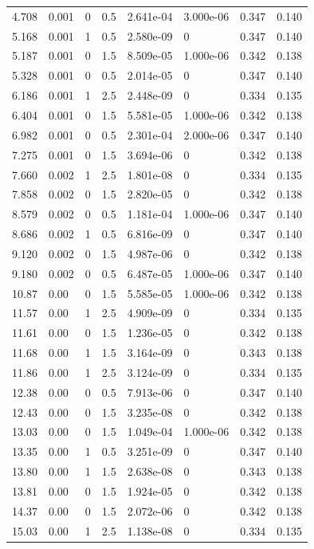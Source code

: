 \documentclass[preview]{standalone}
\begin{document}
{{\begin{tabular}{L{1.2cm}C{1.2cm} C{0.3cm}C{0.5cm} C{1.4cm}C{1.4cm} C{1.4cm}C{1.4cm}}
  4.708  &  0.001  & 0     & 0.5 &  2.641e-04  & 3.000e-06  & 0.347 &  0.140   \\ 
  5.168  &  0.001  & 1     & 0.5 &  2.580e-09  & 0  & 0.347 &  0.140   \\ 
  5.187  &  0.001  & 0     & 1.5 &  8.509e-05  & 1.000e-06  & 0.342 &  0.138   \\ 
  5.328  &  0.001  & 0     & 0.5 &  2.014e-05  & 0  & 0.347 &  0.140   \\ 
  6.186  &  0.001  & 1     & 2.5 &  2.448e-09  & 0  & 0.334 &  0.135   \\ 
  6.404  &  0.001  & 0     & 1.5 &  5.581e-05  & 1.000e-06  & 0.342 &  0.138   \\ 
  6.982  &  0.001  & 0     & 0.5 &  2.301e-04  & 2.000e-06  & 0.347 &  0.140   \\ 
  7.275  &  0.001  & 0     & 1.5 &  3.694e-06  & 0  & 0.342 &  0.138   \\ 
  7.660  &  0.002  & 1     & 2.5 &  1.801e-08  & 0  & 0.334 &  0.135   \\ 
  7.858  &  0.002  & 0     & 1.5 &  2.820e-05  & 0  & 0.342 &  0.138   \\ 
  8.579  &  0.002  & 0     & 0.5 &  1.181e-04  & 1.000e-06  & 0.347 &  0.140   \\ 
  8.686  &  0.002  & 1     & 0.5 &  6.816e-09  & 0  & 0.347 &  0.140   \\ 
  9.120  &  0.002  & 0     & 1.5 &  4.987e-06  & 0  & 0.342 &  0.138   \\ 
  9.180  &  0.002  & 0     & 0.5 &  6.487e-05  & 1.000e-06  & 0.347 &  0.140   \\ 
  10.87  &  0.00  & 0     & 1.5 &  5.585e-05  & 1.000e-06  & 0.342 &  0.138   \\ 
  11.57  &  0.00  & 1     & 2.5 &  4.909e-09  & 0  & 0.334 &  0.135   \\ 
  11.61  &  0.00  & 0     & 1.5 &  1.236e-05  & 0  & 0.342 &  0.138   \\ 
  11.68  &  0.00  & 1     & 1.5 &  3.164e-09  & 0  & 0.343 &  0.138   \\ 
  11.86  &  0.00  & 1     & 2.5 &  3.124e-09  & 0  & 0.334 &  0.135   \\ 
  12.38  &  0.00  & 0     & 0.5 &  7.913e-06  & 0  & 0.347 &  0.140   \\ 
  12.43  &  0.00  & 0     & 1.5 &  3.235e-08  & 0  & 0.342 &  0.138   \\ 
  13.03  &  0.00  & 0     & 1.5 &  1.049e-04  & 1.000e-06  & 0.342 &  0.138   \\ 
  13.35  &  0.00  & 1     & 0.5 &  3.251e-09  & 0  & 0.347 &  0.140   \\ 
  13.80  &  0.00  & 1     & 1.5 &  2.638e-08  & 0  & 0.343 &  0.138   \\ 
  13.81  &  0.00  & 0     & 1.5 &  1.924e-05  & 0  & 0.342 &  0.138   \\ 
  14.37  &  0.00  & 0     & 1.5 &  2.072e-06  & 0  & 0.342 &  0.138   \\ 
  15.03  &  0.00  & 1     & 2.5 &  1.138e-08  & 0  & 0.334 &  0.135   \\ 
\hline 
\end{tabular} 

}}
\end{document}
